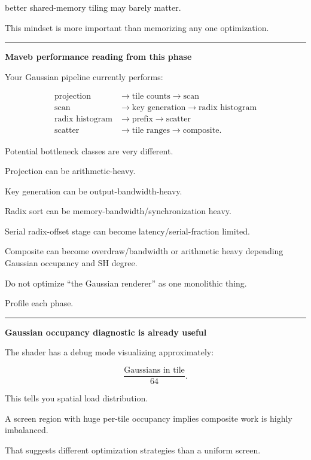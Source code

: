 better shared-memory tiling may barely matter.

This mindset is more important than memorizing any one optimization.

\begin{center}\rule{0.5\linewidth}{0.5pt}\end{center}

\textbf{Maveb performance reading from this phase}

Your Gaussian pipeline currently performs:

\[\begin{aligned}\text{projection} &\rightarrow \text{tile counts} \rightarrow \text{scan}\\\text{scan} &\rightarrow \text{key generation} \rightarrow \text{radix histogram}\\\text{radix histogram} &\rightarrow \text{prefix} \rightarrow \text{scatter}\\\text{scatter} &\rightarrow \text{tile ranges} \rightarrow \text{composite}.\end{aligned}\]

Potential bottleneck classes are very different.

Projection can be arithmetic-heavy.

Key generation can be output-bandwidth-heavy.

Radix sort can be memory-bandwidth/synchronization heavy.

Serial radix-offset stage can become latency/serial-fraction limited.

Composite can become overdraw/bandwidth or arithmetic heavy depending Gaussian occupancy and SH degree.

Do not optimize ``the Gaussian renderer'' as one monolithic thing.

Profile each phase.

\begin{center}\rule{0.5\linewidth}{0.5pt}\end{center}

\textbf{Gaussian occupancy diagnostic is already useful}

The shader has a debug mode visualizing approximately:

\[
\frac{
\text{Gaussians in tile}
}{
64
}.
\]

This tells you spatial load distribution.

A screen region with huge per-tile occupancy implies composite work is highly imbalanced.

That suggests different optimization strategies than a uniform screen.

